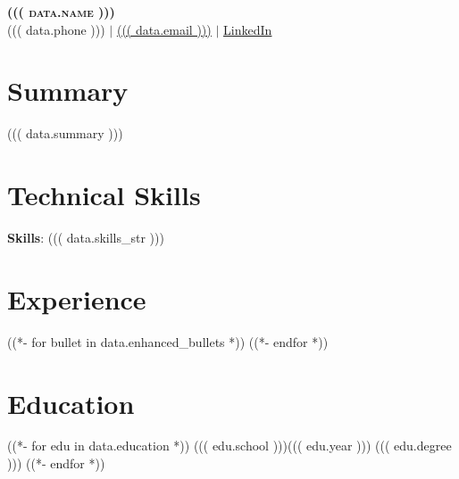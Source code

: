 \documentclass[letterpaper,11pt]{article}
\begin{document}
\begin{center}
    \textbf{\Huge \scshape ((( data.name )))} \\ \vspace{1pt}
    \small ((( data.phone ))) $|$
    \href{mailto:((( data.email )))}{\underline{((( data.email )))}} $|$
    \href{((( data.linkedin )))}{\underline{LinkedIn}}
\end{center}

\section{Summary}
((( data.summary )))

\section{Technical Skills}
\begin{itemize}[leftmargin=0.15in, label={}]
    \small{\item{
        \textbf{Skills}{: ((( data.skills_str )))}
    }}
\end{itemize}

\section{Experience}
((*- for bullet in data.enhanced_bullets *))
((*- endfor *))

\section{Education}
((*- for edu in data.education *))
    \resumeSubheading
      {((( edu.school )))}{((( edu.year )))}
      {((( edu.degree )))}{} 
((*- endfor *))
\end{document}
